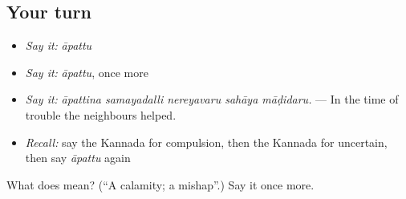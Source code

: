 \subsection*{Your turn}
\begin{itemize}
\raggedright
  \item \emph{Say it:} \emph{āpattu}
  \item \emph{Say it:} \emph{āpattu}, once more
  \item \emph{Say it:} \emph{āpattina samayadalli nereyavaru sahāya māḍidaru.} — In the time of trouble the neighbours helped.
  \item \emph{Recall:} say the Kannada for compulsion, then the Kannada for uncertain, then say \emph{āpattu} again
\end{itemize}

\begin{tcolorbox}[breakable,colback=teal!4,colframe=teal!35!black,title={Before you move on}]
What does  mean? (\textquotedblleft{}A calamity; a mishap\textquotedblright{}.) Say it once more.
\end{tcolorbox}
